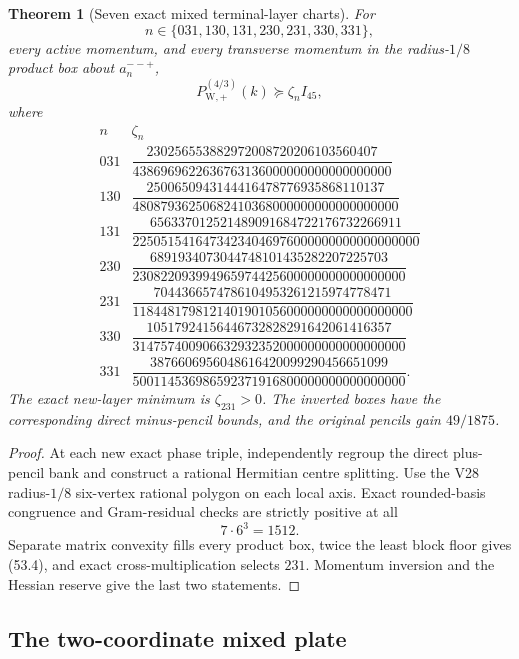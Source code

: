 \documentclass[11pt,oneside]{article}
\newtheorem{theorem}{Theorem}[section]
\theoremstyle{definition}
\theoremstyle{remark}
\begin{document}
\begin{theorem}[Seven exact mixed terminal-layer charts]
\label{thm:newv53-seven-charts}
For
\[
 n\in\{031,130,131,230,231,330,331\},
\]
every active momentum, and every transverse momentum in the
radius-\(1/8\) product box about \(a_n^{--+}\),
\[
 P_{\mathrm W,+}^{(4/3)}(k)\succeq\zeta_n I_{45},     \tag{53.3}
\]
where
\[
\begin{array}{c|c}
n&\zeta_n\\ \hline
031&\dfrac{230256553882972008720206103560407}
{4386969622636763136000000000000000000}\\[5pt]
130&\dfrac{2500650943144416478776935868110137}
{48087936250682410368000000000000000000}\\[5pt]
131&\dfrac{656337012521489091684722176732266911}
{22505154164734234046976000000000000000000}\\[5pt]
230&\dfrac{6891934073044748101435282207225703}
{230822093994965974425600000000000000000}\\[5pt]
231&\dfrac{7044366574786104953261215974778471}
{1184481798121401901056000000000000000000}\\[5pt]
330&\dfrac{10517924156446732828291642061416357}
{314757400906632932352000000000000000000}\\[5pt]
331&\dfrac{3876606956048616420099290456651099}
{500114536986592371916800000000000000000}.
\end{array}                                             \tag{53.4}
\]
The exact new-layer minimum is \(\zeta_{231}>0\).  The inverted
boxes have the corresponding direct minus-pencil bounds, and the
original pencils gain \(49/1875\).
\end{theorem}

\begin{proof}
At each new exact phase triple, independently regroup the direct
plus-pencil bank and construct a rational Hermitian centre
splitting.  Use the V28 radius-\(1/8\) six-vertex rational polygon
on each local axis.  Exact rounded-basis congruence and
Gram-residual checks are strictly positive at all
\[
 7\cdot6^3=1512.                                      \tag{53.5}
\]
Separate matrix convexity fills every product box, twice the least
block floor gives (53.4), and exact cross-multiplication selects
\(231\).  Momentum inversion and the Hessian reserve give the last
two statements.
\end{proof}

\subsection{The two-coordinate mixed plate}
\end{document}
